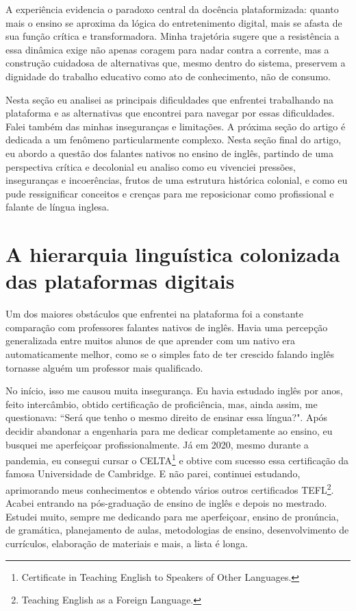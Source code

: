 \documentclass[portuguese]{textolivre}
\begin{document}
A experiência evidencia o paradoxo central da docência plataformizada: quanto mais o ensino se aproxima da lógica do entretenimento digital, mais se afasta de sua função crítica e transformadora. Minha trajetória sugere que a resistência a essa dinâmica exige não apenas coragem para nadar contra a corrente, mas a construção cuidadosa de alternativas que, mesmo dentro do sistema, preservem a dignidade do trabalho educativo como ato de conhecimento, não de consumo.

Nesta seção eu analisei as principais dificuldades que enfrentei trabalhando na plataforma e as alternativas que encontrei para navegar por essas dificuldades. Falei também das minhas inseguranças e limitações. A próxima seção do artigo é dedicada a um fenômeno particularmente complexo. Nesta seção final do artigo, eu abordo a questão dos falantes nativos no ensino de inglês, partindo de uma perspectiva crítica e decolonial \cite{mignolo2005, lander2005} eu analiso como eu vivenciei pressões, inseguranças e incoerências, frutos de uma estrutura histórica colonial, e como eu pude ressignificar conceitos e crenças para me reposicionar como profissional e falante de língua inglesa.

\section{A hierarquia linguística colonizada das plataformas digitais}
Um dos maiores obstáculos que enfrentei na plataforma foi a constante comparação com professores falantes nativos de inglês. Havia uma percepção generalizada entre muitos alunos de que aprender com um nativo era automaticamente melhor, como se o simples fato de ter crescido falando inglês tornasse alguém um professor mais qualificado.

No início, isso me causou muita insegurança. Eu havia estudado inglês por anos, feito intercâmbio, obtido certificação de proficiência, mas, ainda assim, me questionava: ``Será que tenho o mesmo direito de ensinar essa língua?". Após decidir abandonar a engenharia para me dedicar completamente ao ensino, eu busquei me aperfeiçoar profissionalmente. Já em 2020, mesmo durante a pandemia, eu consegui cursar o CELTA\footnote{Certificate in Teaching English to Speakers of Other Languages.} e obtive com sucesso essa certificação da famosa Universidade de Cambridge. E não parei, continuei estudando, aprimorando meus conhecimentos e obtendo vários outros certificados TEFL\footnote{Teaching English as a Foreign Language.}. Acabei entrando na pós-graduação de ensino de inglês e depois no mestrado. Estudei muito, sempre me dedicando para me aperfeiçoar, ensino de pronúncia, de gramática, planejamento de aulas, metodologias de ensino, desenvolvimento de currículos, elaboração de materiais e mais, a lista é longa.
\end{document}
